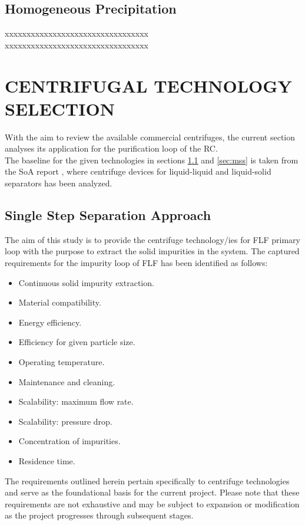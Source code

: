 \subsection{Homogeneous Precipitation}
xxxxxxxxxxxxxxxxxxxxxxxxxxxxxxxxx \\
xxxxxxxxxxxxxxxxxxxxxxxxxxxxxxxxx 

\newpage

\section{CENTRIFUGAL TECHNOLOGY SELECTION} \label{sec:eng}%
With the aim to review the available commercial centrifuges, the current section analyses its application for the purification loop of the RC. \\

\noindent The baseline for the given technologies in sections \ref{sec:sss} and \ref{sec:mss} is taken from the SoA report \cite{SoA}, where centrifuge devices for liquid-liquid and liquid-solid separators has been analyzed. 

\subsection{Single Step Separation Approach}\label{sec:sss}
The aim of this study is to provide the centrifuge technology/ies for FLF primary loop with the purpose to extract the solid impurities in the system. The captured requirements for the impurity loop of FLF has been identified as follows:

\begin{itemize}
	\item Continuous solid impurity extraction.
	\item Material compatibility.
	\item Energy efficiency.
	\item Efficiency for given particle size. 
	\item Operating temperature.
	\item Maintenance and cleaning.
	\item Scalability: maximum flow rate.
	\item Scalability: pressure drop.
	\item Concentration of impurities. 
	\item Residence time.
\end{itemize}

\begin{tcolorbox}[colback=gray!5!white,colframe=gray!75!black,title=Disclaimer]
	The requirements outlined herein pertain specifically to centrifuge technologies and serve as the foundational basis for the current project. Please note that these requirements are not exhaustive and may be subject to expansion or modification as the project progresses through subsequent stages. 
\end{tcolorbox}

